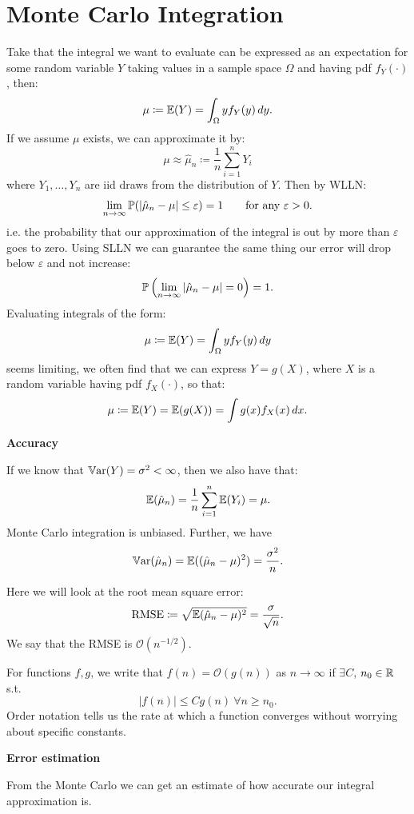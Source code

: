 \documentclass[10pt, a4paper]{article}
\begin{document}
\newpage

\section{Monte Carlo Integration}

Take that the integral we want to evaluate can be expressed as an expectation for some random variable $Y$ taking values in a sample space $\Omega$ and having pdf $f_{Y}(\cdot)$,
then:
\[
\mu \coloneqq \E(Y) = \int_{\Omega}yf_{Y}(y)\,dy.
\]
If we assume $\mu$ exists,
we can approximate it by:
\[
\mu \approx \hat{\mu}_n \coloneqq \frac{1}{n}\sum_{i = 1}^{n}Y_i
\]
where $Y_1, \dotsc, Y_n$ are iid draws from the distribution of $Y$.
Then by WLLN:
\[
\lim_{n \to \infty}\P(|\hat{\mu}_n - \mu| \leq \varepsilon) = 1\qquad\text{for any } \varepsilon > 0.
\]
i.e. the probability that our approximation of the integral is out by more than $\varepsilon$ goes to zero.
Using SLLN we can guarantee the same thing our error will drop below $\varepsilon$ and not increase:
\[
\P\left(\lim_{n \to \infty}|\hat{\mu}_n - \mu| = 0\right) = 1.
\]
Evaluating integrals of the form:
\[
\mu \coloneqq \E(Y) = \int_{\Omega}yf_{Y}(y)\,dy
\]
seems limiting,
we often find that we can express $Y = g(X)$,
where $X$ is a random variable having pdf $f_{X}(\cdot)$,
so that:
\[
\mu \coloneqq \E(Y) = \E(g(X)) = \int g(x)f_{X}(x)\,dx.
\]

\textbf{Accuracy}

If we know that $\Var(Y) = \sigma ^ 2 < \infty$,
then we also have that:
\[
\E(\hat{\mu}_n) = \frac{1}{n}\sum_{i = 1}^{n}\E(Y_i) = \mu.
\]
Monte Carlo integration is unbiased.
Further,
we have
\[
\Var(\hat{\mu}_n) = \E((\hat{\mu}_n - \mu) ^ 2) = \frac{\sigma ^ 2}{n}.
\]

Here we will look at the root mean square error:
\[
\mathrm{RMSE} \coloneqq \sqrt{\E(\hat{\mu}_n - \mu) ^ 2} = \frac{\sigma}{\sqrt{n}}.
\]
We say that the RMSE is $\mathcal{O}(n ^ {-1 / 2})$.

\begin{definition}[Order]
    For functions $f, g$,
    we write that $f(n) = \mathcal{O}(g(n))$ as $n \to \infty$ if $\exists C$,
    $n_0 \in \R$ s.t.
    \[
    |f(n)| \leq Cg(n)\ \forall n \geq n_0.
    \]
    Order notation tells us the rate at which a function converges without worrying about specific constants.
\end{definition}

\textbf{Error estimation}

From the Monte Carlo we can get an estimate of how accurate our integral approximation is.
\end{document}
